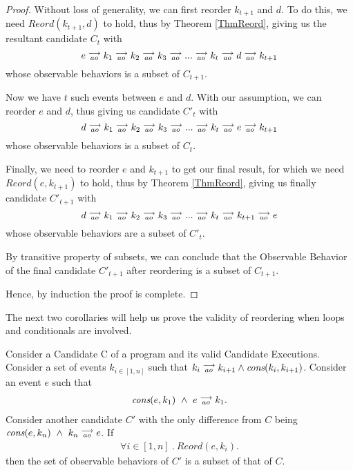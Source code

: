 \begin{proof}
        Without loss of generality, we can first reorder $k_{t+1}$ and $d$. 
        To do this, we need $Reord(k_{t+1}, d)$ to hold, thus by Theorem \ref{ThmReord}, giving us the resultant candidate $C_t$ with  
        \[
            e\stackrel{\longrightarrow}{_{ao}}k_1\stackrel{\longrightarrow}{_{ao}}k_2\stackrel{\longrightarrow}{_{ao}}k_3\stackrel{\longrightarrow}{_{ao}}...\stackrel{\longrightarrow}{_{ao}}k_t\stackrel{\longrightarrow}{_{ao}}d\stackrel{\longrightarrow}{_{ao}}k_{t+1}  
        \]
        whose observable behaviors is a subset of $C_{t+1}$. 

        Now we have $t$ such events between $e$ and $d$. With our assumption, we can reorder $e$ and $d$, thus giving us candidate $C'_t$ with 
        \[
            d\stackrel{\longrightarrow}{_{ao}}k_1\stackrel{\longrightarrow}{_{ao}}k_2\stackrel{\longrightarrow}{_{ao}}k_3\stackrel{\longrightarrow}{_{ao}}...\stackrel{\longrightarrow}{_{ao}}k_t\stackrel{\longrightarrow}{_{ao}}e\stackrel{\longrightarrow}{_{ao}}k_{t+1}  
        \]
        whose observable behaviors is a subset of $C_{t}$. 

        Finally, we need to reorder $e$ and $k_{t+1}$ to get our final result, for which we need $Reord(e, k_{t+1})$ to hold, thus by Theorem \ref{ThmReord},  giving us finally candidate $C'_{t+1}$ with
        \[
            d\stackrel{\longrightarrow}{_{ao}}k_1\stackrel{\longrightarrow}{_{ao}}k_2\stackrel{\longrightarrow}{_{ao}}k_3\stackrel{\longrightarrow}{_{ao}}...\stackrel{\longrightarrow}{_{ao}}k_t\stackrel{\longrightarrow}{_{ao}}k_{t+1}\stackrel{\longrightarrow}{_{ao}}e  
        \]
        whose observable behaviors are a subset of $C'_t$. 

        By transitive property of subsets, we can conclude that the Observable Behavior of the final candidate $C'_{t+1}$ after reordering is a subset of $C_{t+1}$.

        Hence, by induction the proof is complete. 
\end{proof}
    
The next two corollaries will help us prove the validity of reordering when loops and conditionals are involved. 

\begin{corollary}
    \label{CorollCodeMotion1}
    Consider a Candidate C of a program and its valid Candidate Executions. 
    Consider a set of events $k_{i \in[1,n]}$ such that $k_i\stackrel{\longrightarrow}{_{ao}}k_{i+1} \wedge \textit{cons}(k_i,k_{i+1})$.
    Consider an event $e$ such that 
    \begin{align*}
        \textit{cons}(e,k_1) \ \wedge \ e\stackrel{\longrightarrow}{_{ao}}k_1.  
    \end{align*}
    Consider another candidate $C'$ with the only difference from $C$ being $\cons{e}{k_n} \ \wedge \ \reln{k_n}{ao}{e}$.
    If 
    \begin{align*}
        \forall i \in [1,n] \ . \ Reord(e,k_i).
    \end{align*}
    then the set of observable behaviors of $C'$ is a subset of that of $C$.  
\end{corollary}

